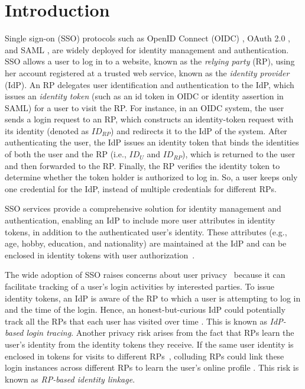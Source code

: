 \section{Introduction}
\label{sec:intro}
Single sign-on (SSO) protocols such as OpenID Connect (OIDC) \cite{OpenIDConnect}, OAuth 2.0 \cite{rfc6749}, and SAML \cite{SAML, SAMLIdentifier}, are widely deployed for identity management and authentication.
SSO allows a user to log in to a website, known as the \emph{relying party} (RP), using her account registered at a trusted web service, known as the \emph{identity provider} (IdP). 
An RP delegates user identification and authentication to the IdP, which issues an \emph{identity token} (such as an id token in OIDC or identity assertion in SAML) for a user to visit the RP. %
For instance, in an OIDC system, the user sends a login request to an RP,
which constructs an identity-token request with its identity (denoted as $ID_{RP}$) and redirects it to the IdP of the system.
After authenticating the user, the IdP issues an identity token that binds the identities of both the user and the RP (i.e., $ID_U$ and $ID_{RP}$), which is returned to the user and then forwarded to the RP.
Finally, the RP verifies the identity token to determine whether the token holder is authorized to log in.
So, a user keeps only one credential for the IdP, instead of multiple credentials for different RPs. 

SSO services provide a comprehensive solution for identity management and authentication, enabling an IdP to include more user attributes in identity tokens, in addition to the authenticated user's identity.
These attributes (e.g., age, hobby, education, and nationality) are maintained at the IdP and can be enclosed in identity tokens with user authorization~\cite{OpenIDConnect,rfc6749}.

The wide adoption of SSO raises concerns about user privacy~\cite{NIST2017draft, SPRESSO, BrowserID, maler2008venn} because it can facilitate tracking of a user's login activities by interested parties.
To issue identity tokens, %
an IdP is aware of the RP to which a user is attempting to log in and the time of the login. 
Hence, an honest-but-curious IdP could potentially track all the RPs that each user has visited over time \cite{BrowserID,SPRESSO}.
This is known as {\em IdP-based login tracing}. 
Another privacy risk arises from the fact that RPs learn the user's identity from the identity tokens they receive. If the same user identity is enclosed in tokens for visits to different RPs~\cite{maler2008venn, Google, FirefoxAccount}, colluding RPs could link these login instances across different RPs %
to learn the user's online profile \cite{maler2008venn}.
This risk is known as {\em RP-based identity linkage}.


